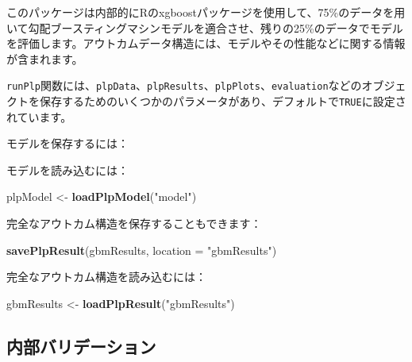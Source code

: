\documentclass[
  11pt]{book}
\newenvironment{Shaded}{\begin{snugshade}}{\end{snugshade}}
\newcommand{\AttributeTok}[1]{\textcolor[rgb]{0.13,0.29,0.53}{#1}}
\newcommand{\FunctionTok}[1]{\textcolor[rgb]{0.13,0.29,0.53}{\textbf{#1}}}
\newcommand{\NormalTok}[1]{#1}
\newcommand{\OtherTok}[1]{\textcolor[rgb]{0.56,0.35,0.01}{#1}}
\newcommand{\SpecialCharTok}[1]{\textcolor[rgb]{0.81,0.36,0.00}{\textbf{#1}}}
\newcommand{\StringTok}[1]{\textcolor[rgb]{0.31,0.60,0.02}{#1}}
\theoremstyle{definition}
\theoremstyle{definition}
\theoremstyle{definition}
\theoremstyle{definition}
\theoremstyle{remark}
\begin{document}
このパッケージは内部的にRのxgboostパッケージを使用して、75\%のデータを用いて勾配ブースティングマシンモデルを適合させ、残りの25\%のデータでモデルを評価します。アウトカムデータ構造には、モデルやその性能などに関する情報が含まれます。

\texttt{runPlp}関数には、\texttt{plpData}、\texttt{plpResults}、\texttt{plpPlots}、\texttt{evaluation}などのオブジェクトを保存するためのいくつかのパラメータがあり、デフォルトで\texttt{TRUE}に設定されています。

モデルを保存するには：

\begin{Shaded}
\end{Shaded}

モデルを読み込むには：

\begin{Shaded}
\begin{Highlighting}[]
\NormalTok{plpModel }\OtherTok{\textless{}{-}} \FunctionTok{loadPlpModel}\NormalTok{(}\StringTok{"model"}\NormalTok{)}
\end{Highlighting}
\end{Shaded}

完全なアウトカム構造を保存することもできます：

\begin{Shaded}
\begin{Highlighting}[]
\FunctionTok{savePlpResult}\NormalTok{(gbmResults, }\AttributeTok{location =} \StringTok{"gbmResults"}\NormalTok{)}
\end{Highlighting}
\end{Shaded}

完全なアウトカム構造を読み込むには：

\begin{Shaded}
\begin{Highlighting}[]
\NormalTok{gbmResults }\OtherTok{\textless{}{-}} \FunctionTok{loadPlpResult}\NormalTok{(}\StringTok{"gbmResults"}\NormalTok{)}
\end{Highlighting}
\end{Shaded}

\subsection{内部バリデーション}\label{ux5185ux90e8ux30d0ux30eaux30c7ux30fcux30b7ux30e7ux30f3}
\end{document}
